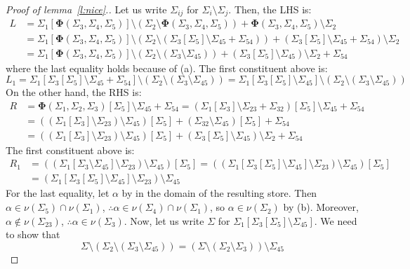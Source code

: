 \documentclass{CSML}
\theoremstyle{definition}\newtheorem{definition}[thm]{Definition}
\theoremstyle{definition}\newtheorem{example}[thm]{Example}
\theoremstyle{definition}\newtheorem{proposition}[thm]{Proposition}
\theoremstyle{definition}\newtheorem{lemma}[thm]{Lemma}
\theoremstyle{definition}\newtheorem{theorem}[thm]{Theorem}
\theoremstyle{definition}\newtheorem{corollary}[thm]{Corollary}
\theoremstyle{definition}\newtheorem{remark}[thm]{Remark}
\renewcommand\Sigma{\varSigma}
\newcommand\remv{\setminus}
\newcommand\nice{\boldsymbol\Phi}
\newcommand\na\alpha
\begin{document}
\begin{proof}[Proof of lemma~\ref{l:nice}.]
Let us write $\Sigma_{ij}$ for $\Sigma_i\remv\Sigma_j$. Then, the LHS is:
\begin{align*} L
&=\Sigma_1[\nice(\Sigma_3,\Sigma_4,\Sigma_5)]\remv(\Sigma_2\remv\nice(\Sigma_3,\Sigma_4,\Sigma_5))+\nice(\Sigma_3,\Sigma_4,\Sigma_5)\remv\Sigma_2 \\
&=\Sigma_1[\nice(\Sigma_3,\Sigma_4,\Sigma_5)]\remv(\Sigma_2\remv(\Sigma_3[\Sigma_5]\remv\Sigma_{45}+\Sigma_{54}))+(\Sigma_3[\Sigma_5]\remv\Sigma_{45}
+\Sigma_{54})\remv\Sigma_2 \\
&=\Sigma_1[\nice(\Sigma_3,\Sigma_4,\Sigma_5)]\remv(\Sigma_2\remv(\Sigma_3\remv\Sigma_{45}))+(\Sigma_3[\Sigma_5]\remv\Sigma_{45})\remv\Sigma_2
+\Sigma_{54}
\end{align*}
where the last equality holds because of (a). The first constituent above is:
\[
L_1 = \Sigma_1[\Sigma_3[\Sigma_5]\remv\Sigma_{45}+\Sigma_{54}]\remv(\Sigma_2\remv(\Sigma_3\remv\Sigma_{45}))
= \Sigma_1[\Sigma_3[\Sigma_5]\remv\Sigma_{45}]\remv(\Sigma_2\remv(\Sigma_3\remv\Sigma_{45}))
\]
On the other hand, the RHS is:
\begin{align*}R
&=\nice(\Sigma_1,\Sigma_2,\Sigma_3)[\Sigma_5]\remv\Sigma_{45}+\Sigma_{54}
=(\Sigma_1[\Sigma_3]\remv\Sigma_{23}+\Sigma_{32})[\Sigma_5]\remv\Sigma_{45}+\Sigma_{54} \\
&=((\Sigma_1[\Sigma_3]\remv\Sigma_{23})\remv\Sigma_{45})[\Sigma_5]+(\Sigma_{32}\remv\Sigma_{45})[\Sigma_5]+\Sigma_{54} \\
&=((\Sigma_1[\Sigma_3]\remv\Sigma_{23})\remv\Sigma_{45})[\Sigma_5]+(\Sigma_{3}[\Sigma_5]\remv\Sigma_{45})\remv\Sigma_2+\Sigma_{54}
\end{align*}
The first constituent above is:
\begin{align*}
R_1 &= ((\Sigma_1[\Sigma_3\remv\Sigma_{45}]\remv\Sigma_{23})\remv\Sigma_{45})[\Sigma_5]
= ((\Sigma_1[\Sigma_3[\Sigma_5]\remv\Sigma_{45}]\remv\Sigma_{23})\remv\Sigma_{45})[\Sigma_5] \\
&= (\Sigma_1[\Sigma_3[\Sigma_5]\remv\Sigma_{45}]\remv\Sigma_{23})\remv\Sigma_{45}
\end{align*}
For the last equality, let $\na$ by in the domain of the resulting store. Then $\na\in\nu(\Sigma_5)\cap\nu(\Sigma_1)$, $\therefore\na\in\nu(\Sigma_4)\cap\nu(\Sigma_1)$, so $\na\in\nu(\Sigma_2)$ by (b). Moreover, $\na\notin\nu(\Sigma_{23})$, $\therefore\na\in\nu(\Sigma_3)$. Now, let us write $\Sigma$ for $\Sigma_1[\Sigma_3[\Sigma_5]\remv\Sigma_{45}]$. We need to show that
\[ \Sigma\remv(\Sigma_2\remv(\Sigma_3\remv\Sigma_{45})) = (\Sigma\remv(\Sigma_{2}\remv\Sigma_{3}))\remv\Sigma_{45} \]

\end{proof}
\end{document}
